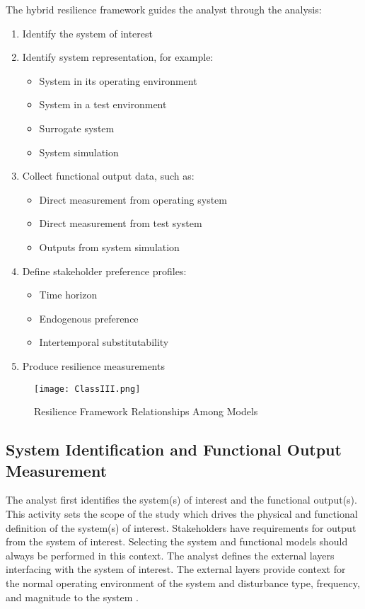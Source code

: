 \documentclass[preprint,12pt]{elsarticle}
\begin{document}
The hybrid resilience framework guides the analyst through the analysis:
\begin{enumerate}
  \item Identify the system of interest
  \item Identify system representation, for example:
    \begin{itemize}
    \item System in its operating environment
    \item System in a test environment
    \item Surrogate system
    \item System simulation
    \end{itemize}
  \item Collect functional output data, such as:
    \begin{itemize}
    \item Direct measurement from operating system
    \item Direct measurement from test system
    \item Outputs from system simulation
    \end{itemize}
  \item Define stakeholder preference profiles:
    \begin{itemize}
    \item Time horizon
    \item Endogenous preference
    \item Intertemporal substitutability
    \end{itemize}
  \item Produce resilience measurements
\end{enumerate}


\begin{figure}[h]
  \centering\texttt{[image: ClassIII.png]}
  \caption{Resilience Framework Relationships Among Models}
  \label{f:ResilienceFramework}
\end{figure}

\subsection{System Identification and Functional Output Measurement}
The analyst first identifies the system(s) of interest and the
functional output(s). This activity sets the scope of the
study which drives the physical and functional definition of the
system(s) of interest. Stakeholders have requirements for output from the
system of interest. Selecting the system and functional models should
always be performed in this context. The analyst defines the external
layers interfacing with the system of interest. The external layers
provide context for the normal operating environment of the system and
disturbance type, frequency, and magnitude to the system \cite{APL2015}.
\end{document}
